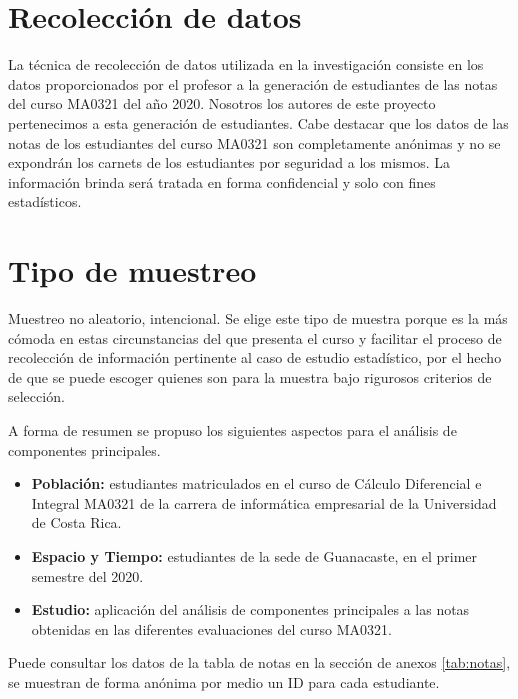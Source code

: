\section{Recolección de datos}
La técnica de recolección de datos utilizada en la investigación consiste en los datos proporcionados por el profesor a la generación de estudiantes de las notas del curso MA0321 del año 2020. Nosotros los autores de este proyecto pertenecimos a esta generación de estudiantes. Cabe destacar que los datos de las notas de los estudiantes del curso MA0321 son completamente anónimas y no se expondrán los carnets de los estudiantes por seguridad a los mismos. La información brinda será tratada en forma confidencial y solo con fines estadísticos.

\section{Tipo de muestreo}
Muestreo no aleatorio, intencional. Se elige este tipo de muestra porque es la más cómoda en estas circunstancias del que presenta el curso y facilitar el proceso de recolección de información pertinente al caso de estudio estadístico, por el hecho de que se puede escoger quienes son para la muestra bajo rigurosos criterios de selección. 

A forma de resumen se propuso los siguientes aspectos para el análisis de componentes principales. 

\begin{itemize}
    \item \textbf{Población:} estudiantes matriculados en el curso de Cálculo Diferencial e Integral MA0321 de la carrera de informática empresarial de la Universidad de Costa Rica.
    \item \textbf{Espacio y Tiempo:} estudiantes de la sede de Guanacaste, en el primer semestre del 2020.
    \item \textbf{Estudio:} aplicación del análisis de componentes principales a las notas obtenidas en las diferentes evaluaciones del curso MA0321.
\end{itemize}

Puede consultar los datos de la tabla de notas en la sección de anexos \ref{tab:notas}, se muestran de forma anónima por medio un ID para cada estudiante.